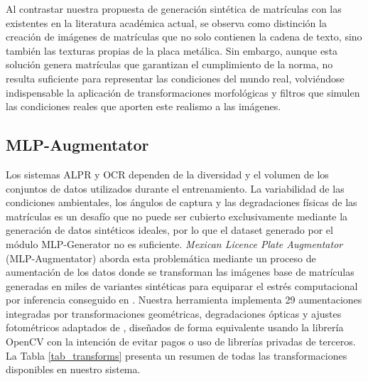 Al contrastar nuestra propuesta de generación sintética de matrículas con las existentes en la literatura académica actual, se observa como distinción la creación de imágenes de matrículas que no solo contienen la cadena de texto, sino también las texturas propias de la placa metálica. Sin embargo, aunque esta solución genera matrículas que garantizan el cumplimiento de la norma, no resulta suficiente para representar las condiciones del mundo real, volviéndose indispensable la aplicación de transformaciones morfológicas y filtros que simulen las condiciones reales que aporten este realismo a las imágenes.
    
\subsection*{MLP-Augmentator}
Los sistemas ALPR y OCR dependen de la diversidad y el volumen de los conjuntos de datos utilizados durante el entrenamiento. La variabilidad de las condiciones ambientales, los ángulos de captura y las degradaciones físicas de las matrículas es un desafío que no puede ser cubierto exclusivamente mediante la generación de datos sintéticos ideales, por lo que el dataset generado por el módulo MLP-Generator no es suficiente. \textit{Mexican Licence Plate Augmentator} (MLP-Augmentator) aborda esta problemática mediante un proceso de aumentación de los datos donde se transforman las imágenes base de matrículas generadas en miles de variantes sintéticas para equiparar el estrés computacional por inferencia conseguido en \cite{jiao-fan2019}. Nuestra herramienta implementa 29 aumentaciones integradas por transformaciones geométricas, degradaciones ópticas y ajustes fotométricos adaptados de \cite{albumentations}, diseñados de forma equivalente usando la librería OpenCV con la intención de evitar pagos o uso de librerías privadas de terceros. La Tabla \ref{tab_transforms} presenta un resumen de todas las transformaciones disponibles en nuestro sistema.

